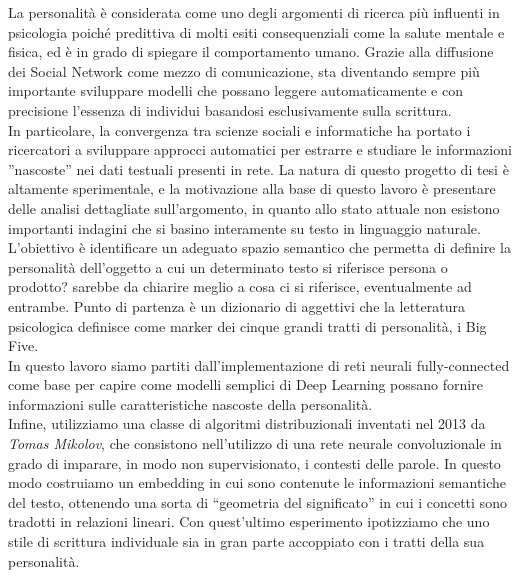 \documentclass[11pt,cucitura,twoside]{toptesi}
\begin{document}
La personalità è considerata come uno degli argomenti di ricerca più influenti in psicologia poiché predittiva di molti esiti consequenziali come la salute mentale e fisica, ed è in grado di spiegare il comportamento umano.
Grazie alla diffusione dei Social Network come mezzo di comunicazione, sta diventando sempre più importante sviluppare modelli che possano leggere automaticamente e con precisione l'essenza di individui basandosi esclusivamente sulla scrittura. 
\\
In particolare, la convergenza tra scienze sociali e informatiche ha portato i ricercatori a sviluppare approcci automatici per estrarre e studiare le informazioni ''nascoste'' nei dati testuali presenti in rete.
La natura di questo progetto di tesi è altamente sperimentale, e la motivazione alla base di questo lavoro è presentare delle analisi dettagliate sull'argomento, in quanto allo stato attuale non esistono importanti indagini che si basino interamente su testo in linguaggio naturale.
\\
L'obiettivo è identificare un adeguato spazio semantico che permetta di definire la personalità dell'oggetto a cui un determinato testo si riferisce {\color{red} persona o prodotto? sarebbe da chiarire meglio a cosa ci si riferisce, eventualmente ad entrambe}. Punto di partenza è un dizionario di aggettivi che la letteratura psicologica definisce come marker dei cinque grandi tratti di personalità, i Big Five.
\\
In questo lavoro siamo partiti dall'implementazione di reti neurali  fully-connected come base per capire come modelli semplici di Deep Learning possano fornire informazioni sulle caratteristiche nascoste della personalità. 
\\
Infine, utilizziamo una classe di algoritmi distribuzionali inventati nel 2013 da \emph{Tomas Mikolov}, che consistono nell'utilizzo di una rete neurale convoluzionale in grado di imparare, in modo non supervisionato, i contesti delle parole.
In questo modo costruiamo un embedding in cui sono contenute le informazioni semantiche del testo, ottenendo una sorta di “geometria del significato” in cui i concetti sono tradotti in relazioni lineari.
Con quest'ultimo esperimento ipotizziamo che uno stile di scrittura individuale sia in gran parte accoppiato con i tratti della sua personalità.


\tableofcontents
\end{document}
